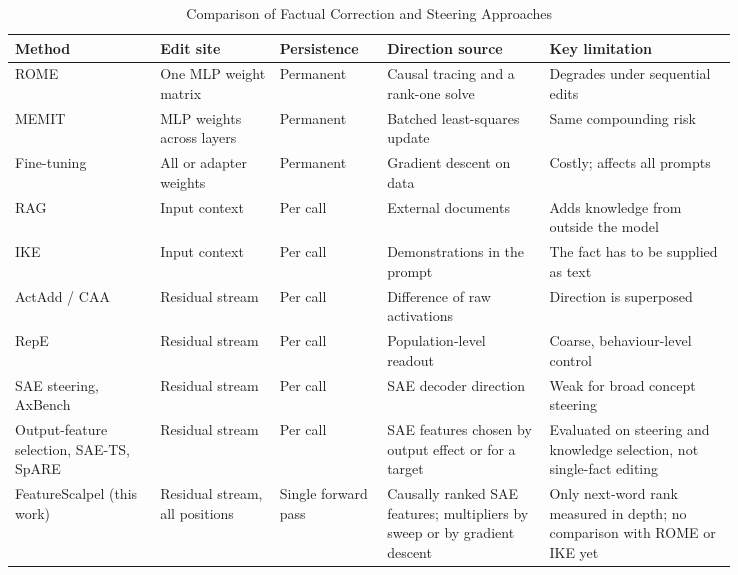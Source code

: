 \documentclass[12pt,a4paper]{report}
\begin{document}
\begin{table}[H]
\centering
\caption{Comparison of Factual Correction and Steering Approaches}\label{tab:comparison}
{\small\renewcommand{\arraystretch}{1.15}
\begin{tabular}{|>{\raggedright\arraybackslash}p{0.175\linewidth}|>{\raggedright\arraybackslash}p{0.145\linewidth}|>{\raggedright\arraybackslash}p{0.115\linewidth}|>{\raggedright\arraybackslash}p{0.190\linewidth}|>{\raggedright\arraybackslash}p{0.220\linewidth}|}
\hline
\textbf{Method} & \textbf{Edit site} & \textbf{Persistence} & \textbf{Direction source} & \textbf{Key limitation} \\ \hline
ROME \cite{r2} & One MLP weight matrix & Permanent & Causal tracing and a rank-one solve & Degrades under sequential edits \cite{r4} \\ \hline
MEMIT \cite{r3} & MLP weights across layers & Permanent & Batched least-squares update & Same compounding risk \cite{r4} \\ \hline
Fine-tuning & All or adapter weights & Permanent & Gradient descent on data & Costly; affects all prompts \\ \hline
RAG \cite{r34} & Input context & Per call & External documents & Adds knowledge from outside the model \\ \hline
IKE \cite{r31} & Input context & Per call & Demonstrations in the prompt & The fact has to be supplied as text \\ \hline
ActAdd / CAA \cite{r9,r10} & Residual stream & Per call & Difference of raw activations & Direction is superposed \\ \hline
RepE \cite{r11} & Residual stream & Per call & Population-level readout & Coarse, behaviour-level control \\ \hline
SAE steering, AxBench \cite{r12} & Residual stream & Per call & SAE decoder direction & Weak for broad concept steering \\ \hline
Output-feature selection, SAE-TS, SpARE \cite{r23,r28,r29} & Residual stream & Per call & SAE features chosen by output effect or for a target & Evaluated on steering and knowledge selection, not single-fact editing \\ \hline
FeatureScalpel (this work) & Residual stream, all positions & Single forward pass & Causally ranked SAE features; multipliers by sweep or by gradient descent & Only next-word rank measured in depth; no comparison with ROME or IKE yet \\ \hline
\end{tabular}}
\end{table}
\end{document}
